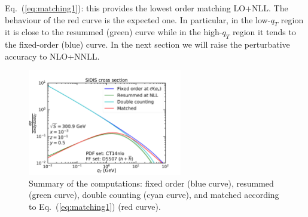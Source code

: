 \documentclass[10pt,a4paper]{article}
\begin{document}
Eq.~(\ref{eq:matching1}): this provides the lowest order matching
LO+NLL. The behaviour of the red curve is the expected one. In
particular, in the low-$q_T$ region it is close to the resummed
(green) curve while in the high-$q_T$ region it tends to the
fixed-order (blue) curve. In the next section we will raise the
perturbative accuracy to NLO+NNLL.
\begin{figure}[t]
  \begin{centering}
    \includegraphics[width=0.6\textwidth]{../plots/FONLL}
    \caption{Summary of the computations: fixed order (blue curve),
      resummed (green curve), double counting (cyan curve), and
      matched according to Eq.~(\ref{eq:matching1}) (red
      curve).\label{fig:FONLL}}
  \end{centering}
\end{figure}


\appendix
\end{document}
